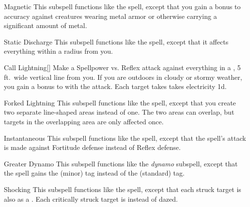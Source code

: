 \begin{ability}[\nth{2}]{Magnetic}
This subspell functions like the  spell, except that you gain a  bonus to accuracy against creatures wearing metal armor or otherwise carrying a significant amount of metal.
\end{ability}
\vspace{0.25em}


\begin{ability}[\nth{2}]{Static Discharge}
This subspell functions like the  spell, except that it affects everything within a \areamed radius from you.
\end{ability}
\vspace{0.25em}


\begin{ability}[\nth{3}]{Call Lightning}[]
Make a Spellpower vs. Reflex attack against everything in a \arealarge, 5 ft.\ wide vertical line from you.
If you are outdoors in cloudy or stormy weather, you gain a  bonus to  with the attack.
\hit Each target takes takes electricity  \plus1d.
\end{ability}
\vspace{0.25em}


\begin{ability}[\nth{3}]{Forked Lightning}
This subspell functions like the  spell, except that you create two separate line-shaped areas instead of one.
The two areas can overlap, but targets in the overlapping area are only affected once.
\end{ability}
\vspace{0.25em}


\begin{ability}[\nth{4}]{Instantaneous}
This subspell functions like the  spell, except that the spell's attack is made against Fortitude defense instead of Reflex defense.
\end{ability}
\vspace{0.25em}


\begin{ability}[\nth{5}]{Greater Dynamo}
This subspell functions like the \textit{dynamo} subspell, except that the spell gains the  (minor) tag instead of the  (standard) tag.
\end{ability}
\vspace{0.25em}


\begin{ability}[\nth{5}]{Shocking}
This subspell functions like the  spell, except that each struck target is also  as a .
Each critically struck target is  instead of dazed.
\end{ability}
\vspace{0.25em}


